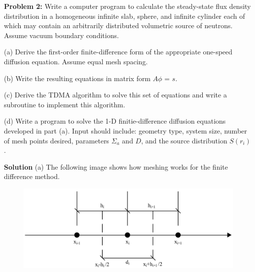 \documentclass{amsart}
\theoremstyle{definition}
\begin{document}

\newpage

\textbf{Problem 2:} Write a computer program to calculate the steady-state flux density distribution in a homogeneous infinite slab, sphere, and infinite cylinder each of which may contain an arbitrarily distributed volumetric source of neutrons.
Assume vacuum boundary conditions.
\bigbreak

(a) Derive the first-order finite-difference form of the appropriate one-speed diffusion equation.
Assume equal mesh spacing.\newline
\bigbreak

(b) Write the resulting equations in matrix form \textbf{$A\phi$} = \textbf{$s$}.\newline
\bigbreak

(c) Derive the TDMA algorithm to solve this set of equations and write a subroutine to implement this algorithm.\newline
\bigbreak

(d) Write a program to solve the 1-D finitie-difference diffusion equations developed in part (a).
Input should include: geometry type, system size, number of mesh points desired, parameters $\Sigma_a$ and $D$, and the source distribution $S(r_i)$.\newline
\bigbreak


\textbf{Solution}
\bigbreak
(a) The following image shows how meshing works for the finite difference method.
\bigbreak


\begin{figure}[h!]
    \includegraphics[width=.7\linewidth]{FD2}
\end{figure}
\end{document}
